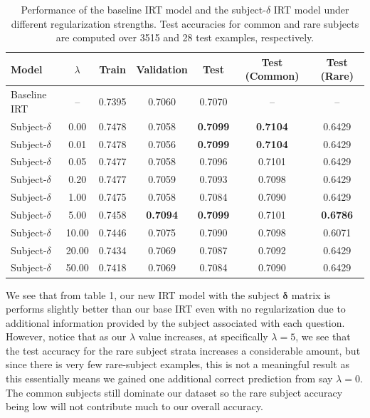 \documentclass[11pt]{article}
\begin{document}
\begin{table}[ht]
\centering
\caption{Performance of the baseline IRT model and the subject-$\delta$ IRT model under different regularization strengths. Test accuracies for common and rare subjects are computed over 3515 and 28 test examples, respectively.}
\label{tab:lambda_sweep}
\begin{tabular}{lcccccc}
\hline
Model & $\lambda$ & Train & Validation & Test & Test (Common) & Test (Rare) \\
\hline
Baseline IRT & -- & 0.7395 & 0.7060 & 0.7070 & -- & -- \\
\hline
Subject-$\delta$ & 0.00  & 0.7478 & 0.7058 & \textbf{0.7099} & \textbf{0.7104} & 0.6429 \\
Subject-$\delta$ & 0.01  & 0.7478 & 0.7056 & \textbf{0.7099} & \textbf{0.7104} & 0.6429 \\
Subject-$\delta$ & 0.05  & 0.7477 & 0.7058 & 0.7096 & 0.7101 & 0.6429 \\
Subject-$\delta$ & 0.20  & 0.7477 & 0.7059 & 0.7093 & 0.7098 & 0.6429 \\
Subject-$\delta$ & 1.00  & 0.7475 & 0.7058 & 0.7084 & 0.7090 & 0.6429 \\
Subject-$\delta$ & 5.00  & 0.7458 & \textbf{0.7094} & \textbf{0.7099} & 0.7101 & \textbf{0.6786} \\
Subject-$\delta$ & 10.00 & 0.7446 & 0.7075 & 0.7090 & 0.7098 & 0.6071 \\
Subject-$\delta$ & 20.00 & 0.7434 & 0.7069 & 0.7087 & 0.7092 & 0.6429 \\
Subject-$\delta$ & 50.00 & 0.7418 & 0.7069 & 0.7084 & 0.7090 & 0.6429 \\
\hline
\end{tabular}
\end{table}

We see that from table 1, our new IRT model with the subject $\boldsymbol{\delta}$ matrix is performs slightly better than our base IRT even with no regularization due to additional information provided by the subject associated with each question. However, notice that as our $\lambda$ value increases, at specifically $\lambda = 5$, we see that the test accuracy for the rare subject strata increases a considerable amount, but since there is very few rare-subject examples, this is not a meaningful result as this essentially means we gained one additional correct prediction from say $\lambda = 0$. The common subjects still dominate our dataset so the rare subject accuracy being low will not contribute much to our overall accuracy. 
\end{document}
